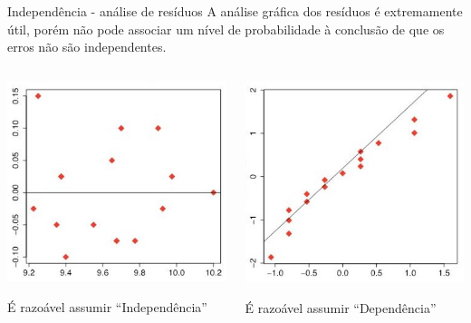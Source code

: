 \documentclass{bredelebeamer}
\begin{document}
\begin{frame}
\begin{block}{Independência - análise de resíduos}
A análise gráfica dos resíduos é extremamente útil, porém não pode
associar um nível de probabilidade à conclusão de que os erros não são
independentes.
\end{block}

\vspace{.2cm}

\begin{columns}
\begin{column}{0.5\textwidth}
\centering
\includegraphics[scale=.22]{images/plot_indep.jpg}
\begin{center}
É razoável assumir ``Independência''
\end{center}
\end{column}

\begin{column}{0.5\textwidth}
\centering
\includegraphics[scale=.22]{images/plot_dep.jpg}
\begin{center}
É razoável assumir ``Dependência''
\end{center}
\end{column}
\end{columns}



\end{frame}
\end{document}

